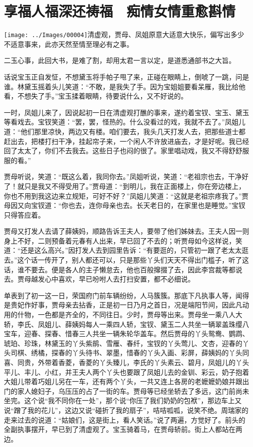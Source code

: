 

\chapter{享福人福深还祷福　痴情女情重愈斟情}\label{part0033_split_000.htmlux5cux23calibre_pb_0}

{\texttt{[image: ../Images/00004]}清虚观，贾母、凤姐原意大适意大快乐，偏写出多少不适意事来，此亦天然至情至理必有之事。}

{二玉心事，此回大书，是难了割，却用太君一言以定，是道悉通部书之大旨。}

话说宝玉正自发怔，不想黛玉将手帕子甩了来，正碰在眼睛上，倒唬了一跳，问是谁。林黛玉摇着头儿笑道：``不敢，是我失了手。因为宝姐姐要看呆雁，我比给他看，不想失了手。''宝玉揉着眼睛，待要说什么，又不好说的。

一时，凤姐儿来了，因说起初一日在清虚观打醮的事来，遂约着宝钗、宝玉、黛玉等看戏去。宝钗笑道：``罢，罢，怪热的。什么没看过的戏，我就不去了。''凤姐儿道：``他们那里凉快，两边又有楼。咱们要去，我头几天打发人去，把那些道士都赶出去，把楼打扫干净，挂起帘子来，一个闲人不许放进庙去，才是好呢。我已经回了太太了，你们不去我去。这些日子也闷的很了。家里唱动戏，我又不得舒舒服服的看。''

贾母听说，笑道：``既这么着，我同你去。''凤姐听说，笑道：``老祖宗也去，干净好了！就只是我又不得受用了。''贾母道：``到明儿，我在正面楼上，你在旁边楼上，你也不用到我这边来立规矩，可好不好？''凤姐儿笑道：``这就是老祖宗疼我了。''贾母因又向宝钗道：``你也去，连你母亲也去。长天老日的，在家里也是睡觉。''宝钗只得答应着。

贾母又打发人去请了薛姨妈，顺路告诉王夫人，要带了他们姊妹去。王夫人因一则身上不好，二则预备着元春有人出来，早已回了不去的；听贾母如今这样说，笑道：``还是这么高兴。''因打发人去到园里告诉：``有要逛的，只管初一跟了老太太逛去。''这个话一传开了，别人都还可以，只是那些丫头们天天不得出门槛子，听了这话，谁不要去。便是各人的主子懒怠去，他也百般撺掇了去，因此李宫裁等都说去。贾母越发心中喜欢，早已吩咐人去打扫安置，都不必细说。

单表到了初一这一日，荣国府门前车辆纷纷，人马簇簇。那底下凡执事人等，闻得是贵妃作好事，贾母亲去拈香，正是初一日乃月之首日，况是端阳节间，因此凡动用的什物，一色都是齐全的，不同往日。少时，贾母等出来。贾母坐一乘八人大轿，李氏、凤姐儿、薛姨妈每人一乘四人轿，宝钗、黛玉二人共坐一辆翠盖珠缨八宝车，迎春、探春、惜春三人共坐一辆朱轮华盖车。然后贾母的丫头鸳鸯、鹦鹉、琥珀、珍珠，林黛玉的丫头紫鹃、雪雁、春纤，宝钗的丫头莺儿、文杏，迎春的丫头司棋、绣橘，探春的丫头待书、翠墨，惜春的丫头入画、彩屏，薛姨妈的丫头同喜、同贵，外带着香菱，香菱的丫头臻儿，李氏的丫头素云、碧月，凤姐儿的丫头平儿、丰儿、小红，并王夫人两个丫头也要跟了凤姐儿去的金钏、彩云，奶子抱着大姐儿带着巧姐儿另在一车，还有两个丫头，一共又连上各房的老嬷嬷奶娘并跟出门的家人媳妇子，乌压压的占了一街的车。贾母等已经坐轿去了多远，这门前尚未坐完。这个说``我不同你在一处''，那个说``你压了我们奶奶的包袱''，那边车上又说``蹭了我的花儿''，这边又说``碰折了我的扇子''，咭咭呱呱，说笑不绝。周瑞家的走来过去的说道：``姑娘们，这是街上，看人笑话。''说了两遍，方觉好了。前头的全副执事摆开，早已到了清虚观了。宝玉骑着马，在贾母轿前。街上人都站在两边。

